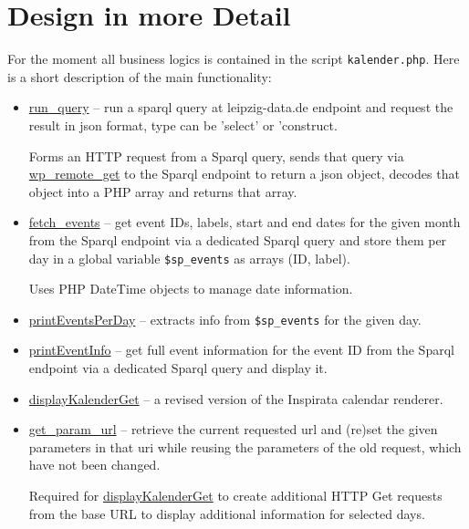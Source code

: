 \documentclass[11pt,a4paper]{article}
\begin{document}
\section{Design in more Detail}

For the moment all business logics is contained in the script
\texttt{kalender.php}. Here is a short description of the main functionality:
\begin{itemize}
\item \url{run_query} -- run a sparql query at leipzig-data.de endpoint
  and request the result in json format, type can be 'select' or 'construct.

  Forms an HTTP request from a Sparql query, sends that query via
  \url{wp_remote_get} to the Sparql endpoint to return a json object, decodes
  that object into a PHP array and returns that array.

\item \url{fetch_events} -- get event IDs, labels, start and end dates for the
  given month from the Sparql endpoint via a dedicated Sparql query and store
  them per day in a global variable \texttt{\$sp\_events} as arrays (ID,
  label).

  Uses PHP DateTime objects to manage date information. 
\item \url{printEventsPerDay} -- extracts info from \texttt{\$sp\_events} for
  the given day.
\item \url{printEventInfo} -- get full event information for the event ID from the
  Sparql endpoint via a dedicated Sparql query and display it. 
\item \url{displayKalenderGet} -- a revised version of the Inspirata calendar
  renderer. 
\item \url{get_param_url} -- retrieve the current requested url and (re)set
  the given parameters in that uri while reusing the parameters of the old
  request, which have not been changed.

  Required for \url{displayKalenderGet} to create additional HTTP Get requests
  from the base URL to display additional information for selected days. 
\end{itemize}
\end{document}
